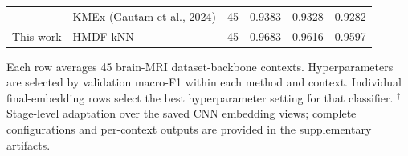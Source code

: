 \begin{table}[t]
\begin{tabular}{p{3.1cm}p{7.1cm}rrrr}
 & KMEx (Gautam et al., 2024) \cite{gautam2024kmex} & 45 & 0.9383 & 0.9328 & 0.9282 \\
\addlinespace[2pt]
This work & HMDF-kNN & 45 & 0.9683 & 0.9616 & 0.9597 \\
\bottomrule
\end{tabular}
\par\vspace{2pt}
\scriptsize Each row averages 45 brain-MRI dataset-backbone contexts. Hyperparameters are selected by validation macro-F1 within each method and context. Individual final-embedding rows select the best hyperparameter setting for that classifier. $^\dagger$Stage-level adaptation over the saved CNN embedding views; complete configurations and per-context outputs are provided in the supplementary artifacts.
\end{table}

